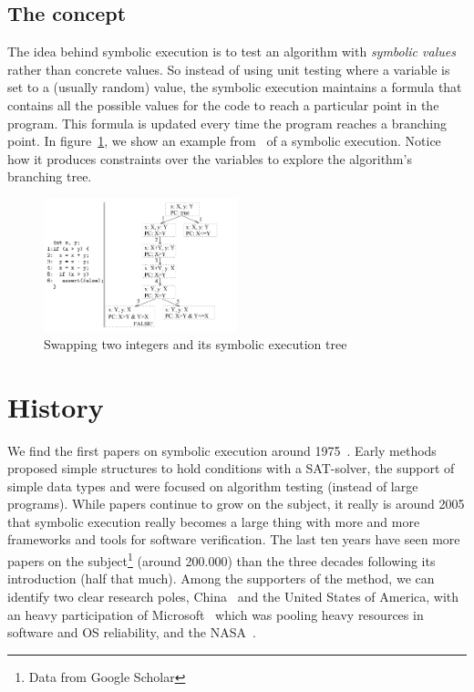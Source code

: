 \documentclass[11pt]{IEEEtran}
\begin{document}
    \subsection{The concept}
      The idea behind symbolic execution is to test an algorithm with \emph{symbolic values} rather than concrete values. So instead of using unit testing where a variable is set to a (usually random) value, the symbolic execution maintains a formula that contains all the possible values for the code to reach a particular point in the program. This formula is updated every time the program reaches a branching point. In figure~\ref{fig:symbolicsimple}, we show an example from~\cite{visserWillemCorina} of a symbolic execution. Notice how it produces constraints over the variables to explore the algorithm's branching tree.
      \begin{figure}
        \includegraphics[width=0.5\textwidth]{symbolicsimple}
        \caption{Swapping two integers and its symbolic execution tree}
        \label{fig:symbolicsimple}
      \end{figure}

  \section{History}
    We find the first papers on symbolic execution around 1975~\cite{newapproach}. Early methods proposed simple structures to hold conditions with a SAT-solver, the support of simple data types and were focused on algorithm testing (instead of large programs). While papers continue to grow on the subject, it really is around 2005 that symbolic execution really becomes a large thing with more and more frameworks and tools for software verification. The last ten years have seen more papers on the subject\footnote{Data from Google Scholar} (around 200.000) than the three decades following its introduction (half that much). Among the supporters of the method, we can identify two clear research poles, China~\cite{Hardware, memorytablemodel, CHEN2018118} and the United States of America, with an heavy participation of Microsoft~\cite{bouncer-securing-software-by-blocking-bad-input} which was pooling heavy resources in software and OS reliability, and the NASA~\cite{neurosymbolicexecution, DirectedIncrementalSymExe, visserWillemCorina}.
\end{document}
